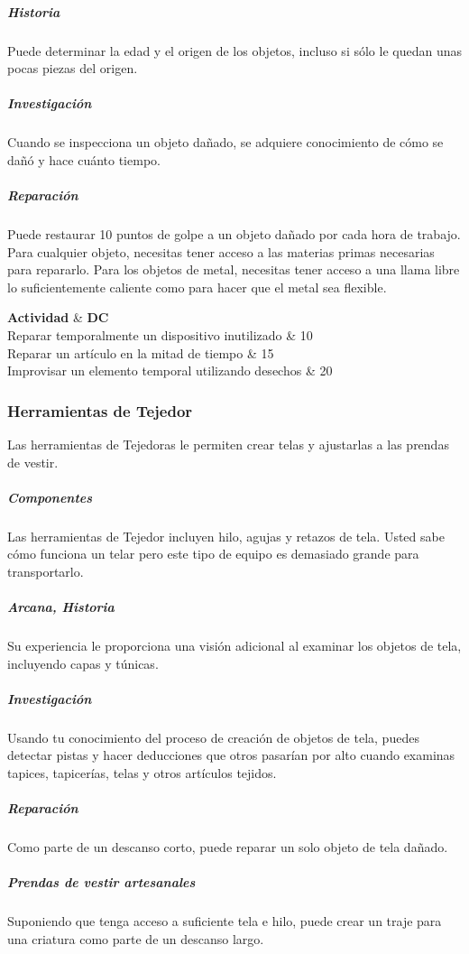 \documentclass[a4paper,twocolumn,openany,10pt]{dndbook}
\begin{document}
\subparagraph{Historia} Puede determinar la edad y el origen de los objetos, incluso si sólo le quedan unas pocas piezas del
origen.

\subparagraph{Investigación} Cuando se inspecciona un objeto dañado, se adquiere conocimiento de cómo se dañó y hace cuánto
tiempo.

\subparagraph{Reparación} Puede restaurar 10 puntos de golpe a un objeto dañado por cada hora de trabajo. Para cualquier objeto,
necesitas tener acceso a las materias primas necesarias para repararlo. Para los objetos de metal, necesitas tener acceso a una
llama libre lo suficientemente caliente como para hacer que el metal sea flexible. 

\begin{dndtable}[Xc]
	\textbf{Actividad}										& \textbf{DC}	\\
	Reparar temporalmente un dispositivo inutilizado		& 10	\\
	Reparar un artículo en la mitad de tiempo				& 15	\\
	Improvisar un elemento temporal utilizando desechos 	& 20	\\
\end{dndtable}

\subsubsection*{Herramientas de Tejedor} 
Las herramientas de Tejedoras le permiten crear telas y ajustarlas a las prendas de vestir.

\subparagraph{Componentes} Las herramientas de Tejedor incluyen hilo, agujas y retazos de tela. Usted sabe cómo funciona un telar
pero este tipo de equipo es demasiado grande para transportarlo.

\subparagraph{Arcana, Historia} Su experiencia le proporciona una visión adicional al examinar los objetos de tela, incluyendo
capas y túnicas.

\subparagraph{Investigación} Usando tu conocimiento del proceso de creación de objetos de tela, puedes detectar pistas y hacer
deducciones que otros pasarían por alto cuando examinas tapices, tapicerías, telas y otros artículos tejidos.

\subparagraph{Reparación} Como parte de un descanso corto, puede reparar un solo objeto de tela dañado.

\subparagraph{Prendas de vestir artesanales} Suponiendo que tenga acceso a suficiente tela e hilo, puede crear un traje para una
criatura como parte de un descanso largo.
\end{document}

